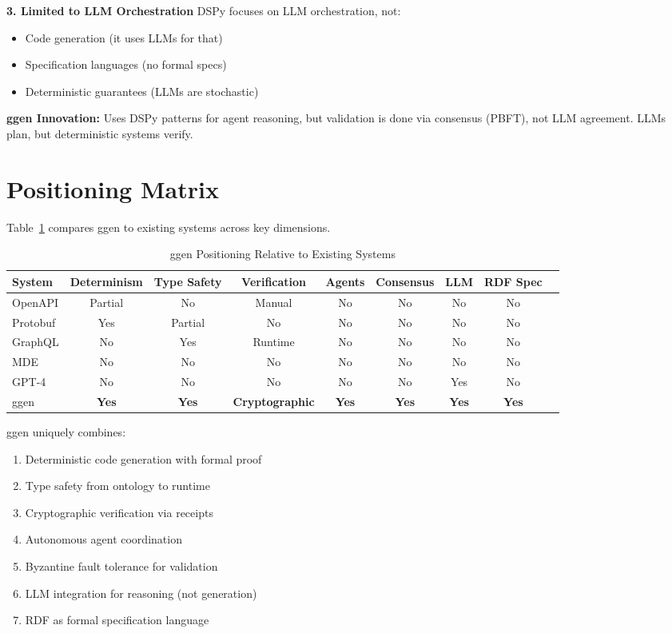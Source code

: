\textbf{3. Limited to LLM Orchestration}
DSPy focuses on LLM orchestration, not:
\begin{itemize}
    \item Code generation (it uses LLMs for that)
    \item Specification languages (no formal specs)
    \item Deterministic guarantees (LLMs are stochastic)
\end{itemize}

\textbf{ggen Innovation:} Uses DSPy patterns for agent reasoning, but validation is done via consensus (PBFT), not LLM agreement. LLMs plan, but deterministic systems verify.

\section{Positioning Matrix}

Table~\ref{tab:positioning} compares ggen to existing systems across key dimensions.

\begin{table}[h]
\centering
\caption{ggen Positioning Relative to Existing Systems}
\label{tab:positioning}
\small
\begin{tabular}{lcccccccc}
\toprule
\textbf{System} & \textbf{Determinism} & \textbf{Type Safety} & \textbf{Verification} & \textbf{Agents} & \textbf{Consensus} & \textbf{LLM} & \textbf{RDF Spec} \\
\midrule
OpenAPI & Partial & No & Manual & No & No & No & No \\
Protobuf & Yes & Partial & No & No & No & No & No \\
GraphQL & No & Yes & Runtime & No & No & No & No \\
MDE & No & No & No & No & No & No & No \\
GPT-4 & No & No & No & No & No & Yes & No \\
ggen & \textbf{Yes} & \textbf{Yes} & \textbf{Cryptographic} & \textbf{Yes} & \textbf{Yes} & \textbf{Yes} & \textbf{Yes} \\
\bottomrule
\end{tabular}
\end{table}

ggen uniquely combines:
\begin{enumerate}
    \item Deterministic code generation with formal proof
    \item Type safety from ontology to runtime
    \item Cryptographic verification via receipts
    \item Autonomous agent coordination
    \item Byzantine fault tolerance for validation
    \item LLM integration for reasoning (not generation)
    \item RDF as formal specification language
\end{enumerate}


